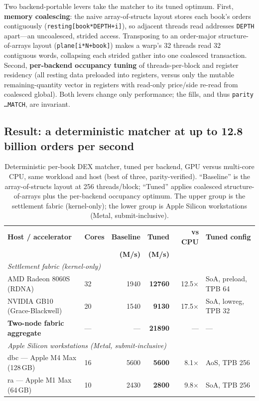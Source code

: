 Two backend-portable levers take the matcher to its tuned optimum. First, \textbf{memory
coalescing}: the naive array-of-structs layout stores each book's orders contiguously
(\texttt{resting[book*DEPTH+i]}), so adjacent threads read addresses \texttt{DEPTH} apart---an
uncoalesced, strided access. Transposing to an order-major structure-of-arrays layout
(\texttt{plane[i*N+book]}) makes a warp's 32 threads read 32 contiguous words, collapsing each
strided gather into one coalesced transaction. Second, \textbf{per-backend occupancy tuning} of
threads-per-block and register residency (all resting data preloaded into registers, versus only
the mutable remaining-quantity vector in registers with read-only price/side re-read from
coalesced global). Both levers change only performance; the fills, and thus \texttt{parity
\dots MATCH}, are invariant.

\subsection{Result: a deterministic matcher at up to 12.8 billion orders per second}

\begin{table}[h]
\centering
\caption{Deterministic per-book DEX matcher, tuned per backend, GPU versus multi-core CPU, same
workload and host (best of three, parity-verified). ``Baseline'' is the array-of-structs layout
at 256 threads/block; ``Tuned'' applies coalesced structure-of-arrays plus the per-backend
occupancy optimum. The upper group is the settlement fabric (kernel-only); the lower group is
Apple Silicon workstations (Metal, submit-inclusive).}
\label{tab:dex-gpu-cpu}
\begin{tabular}{llrrrl}
\toprule
\textbf{Host / accelerator} & \textbf{Cores} & \textbf{Baseline} & \textbf{Tuned} & \textbf{vs CPU} & \textbf{Tuned config} \\
 & & \textbf{(M/s)} & \textbf{(M/s)} & & \\
\midrule
\multicolumn{6}{l}{\textit{Settlement fabric (kernel-only)}}\\
AMD Radeon 8060S (RDNA)       & 32 & 1940 & \textbf{12760} & 12.5$\times$ & SoA, preload, TPB 64 \\
NVIDIA GB10 (Grace-Blackwell) & 20 & 1540 & \textbf{9130}  & 17.5$\times$ & SoA, lowreg, TPB 32 \\
\textbf{Two-node fabric aggregate} & --- & --- & \textbf{21890} & --- & --- \\
\midrule
\multicolumn{6}{l}{\textit{Apple Silicon workstations (Metal, submit-inclusive)}}\\
dbc --- Apple M4 Max (128\,GB)  & 16 & 5600 & \textbf{5600} & 8.1$\times$ & AoS, TPB 256 \\
ra --- Apple M1 Max (64\,GB)    & 10 & 2430 & \textbf{2800} & 9.8$\times$ & SoA, TPB 256 \\
\bottomrule
\end{tabular}
\end{table}

